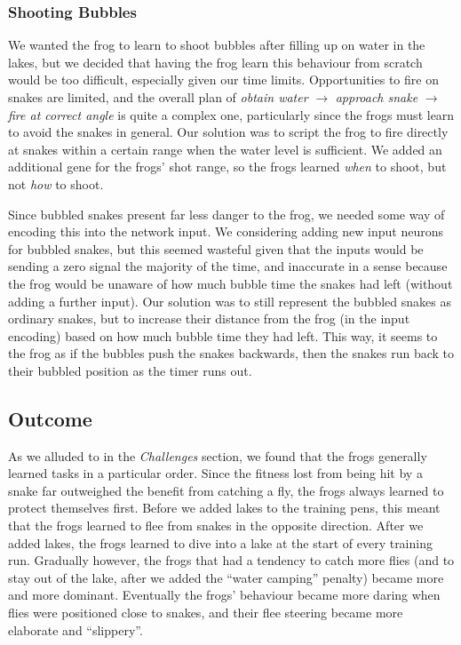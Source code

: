 \subsubsection{Shooting Bubbles}
\label{sec:bubbles}
We wanted the frog to learn to shoot bubbles after filling up on water in the lakes, but we decided that having the frog learn this behaviour from scratch would be too difficult, especially given our time limits. Opportunities to fire on snakes are limited, and the overall plan of \textit{obtain water} $\rightarrow$ \textit{approach snake} $\rightarrow$ \textit{fire at correct angle} is quite a complex one, particularly since the frogs must learn to avoid the snakes in general. Our solution was to script the frog to fire directly at snakes within a certain range when the water level is sufficient. We added an additional gene for the frogs' shot range, so the frogs learned \textit{when} to shoot, but not \textit{how} to shoot.

Since bubbled snakes present far less danger to the frog, we needed some way of encoding this into the network input. We considering adding new input neurons for bubbled snakes, but this seemed wasteful given that the inputs would be sending a zero signal the majority of the time, and inaccurate in a sense because the frog would be unaware of how much bubble time the snakes had left (without adding a further input). Our solution was to still represent the bubbled snakes as ordinary snakes, but to increase their distance from the frog (in the input encoding) based on how much bubble time they had left. This way, it seems to the frog as if the bubbles push the snakes backwards, then the snakes run back to their bubbled position as the timer runs out.

\subsection{Outcome}
As we alluded to in the \textit{Challenges} section, we found that the frogs generally learned tasks in a particular order. Since the fitness lost from being hit by a snake far outweighed the benefit from catching a fly, the frogs always learned to protect themselves first. Before we added lakes to the training pens, this meant that the frogs learned to flee from snakes in the opposite direction. After we added lakes, the frogs learned to dive into a lake at the start of every training run. Gradually however, the frogs that had a tendency to catch more flies (and to stay out of the lake, after we added the ``water camping'' penalty) became more and more dominant. Eventually the frogs' behaviour became more daring when flies were positioned close to snakes, and their flee steering became more elaborate and ``slippery''.

